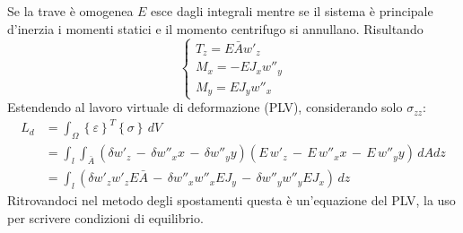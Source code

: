 Se la trave è omogenea $E$ esce dagli integrali mentre se il sistema è principale d'inerzia i momenti statici e il momento centrifugo si annullano. Risultando
\begin{equation*}
    \begin{cases}
        T_z = E\bar{A} w'_z\\
        M_x = -EJ_xw''_y\\
        M_y = EJ_yw''_x
    \end{cases}
\end{equation*}
Estendendo al lavoro virtuale di deformazione (PLV), considerando solo $\sigma_{zz}$:
\begin{align*}
     L_d &= \int_\Omega  \left\{\varepsilon\right\}^T \left\{\sigma\right\}\, dV\\
     &= \int_l\int_{\bar{A}} ( \delta w'_z \,-\,\delta w''_x  x\, -\,\delta w''_y  y)   (E\,w'_z \,-\,E\,w''_x  x\, -\,E\,w''_y  y)\,dAdz\\
     &= \int_l(\delta w'_z w'_z E\bar{A}\,-\,\delta w''_xw''_x EJ_y  \, -\,\delta w''_yw''_yEJ_x  )\,dz
\end{align*}
Ritrovandoci nel metodo degli spostamenti questa è un'equazione del PLV, la uso per scrivere condizioni di equilibrio.



